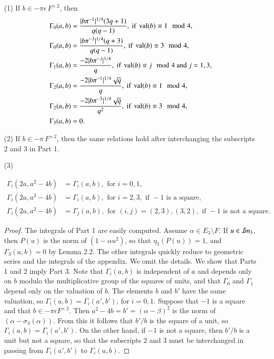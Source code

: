 \documentclass{amsart}
\newcommand\Imm{{\mathcal I\hskip-.2em m}}
\newcommand\val{\operatorname{val}}
\newenvironment{cthm}[1]
  {\renewcommand\thethm{\bf #1}\thm}
  {\endthm}
\begin{document}
\bigskip
\noindent
\begin{cthm}{Lemma 2.6}
(1)  If $b\in -\pi\epsilon\,F^{\times\,2}$, then
\begin{align*}
\Gamma_0(a,b) &= {|b\pi^{-1}|^{1/4}(3q+1)\over q(q-1)}, \text{ if }
			\val(b)\equiv 1 \mod 4,\\
\Gamma_0(a,b) &= {|b\pi^{-3}|^{1/4}(q+3)\over q(q-1)}, \text{ if }
			\val(b)\equiv 3 \mod 4,\\
\Gamma_1(a,b) &= {-2|b\pi^{-j}|^{1/4}\over q}, \text{ if }
			\val(b)\equiv j \mod 4 \text{ and } j=1, 3,\\
\Gamma_2(a,b) &= {-2|b\pi^{-1}|^{1/4}\sqrt{q}\over q}, \text{ if }
			\val(b)\equiv 1 \mod 4,\\
\Gamma_2(a,b) &= {-2|b\pi^{-3}|^{1/4}\sqrt{q}\over q^2}, \text{ if }
			\val(b)\equiv 3 \mod 4,\\
\Gamma_3(a,b) &= 0.
\end{align*}
\smallskip

(2)  If $b\in -\pi\,F^{\times\,2}$, then the same relations
hold after interchanging the subscripts $2$ and $3$ in Part 1.


\smallskip
(3)

\begin{align*}
\Gamma_i(2a,a^2-4b) &= \Gamma_i(a,b), \text{ for } i=0,1,\\
\Gamma_i(2a,a^2-4b) &= \Gamma_i(a,b), \text{ for } i=2,3, \text{ if }
		-1 \text{ is a square,}\\
\Gamma_i(2a,a^2-4b) &= \Gamma_j(a,b), \text{ for } (i,j) = (2,3), (3,2),
		\text{ if } -1 \text { is not a square.}
\end{align*}

\end{cthm}

\smallskip

\noindent
\begin{proof}
The integrals of Part 1 are easily computed. 
Assume 
$\alpha\in E_3\setminus F$.  
If $u\in \Imm_3$, then $P(u)$ is
the norm of $(1-\alpha u^2)$, so that $\eta_3(P(u)) = 1$,
and $\Gamma_3(a,b)=0$ by Lemma 2.2.
The other integrals quickly reduce to geometric series and the
integrals of the appendix.
 We omit the details.
We show that Parts 1 and 2 imply Part 3.
Note that
$\Gamma_i(a,b)$ is independent of $a$ and depends only on $b$ modulo
the multiplicative group of the squares of units, 
and that $\Gamma_0$ and $\Gamma_1$ depend only on the
valuation of $b$.  The elements $b$ and $b'$ have the same
valuation, so $\Gamma_i(a,b) = \Gamma_i(a',b')$, for
$i=0,1$.
Suppose that $-1$ is a square and that 
$b\in -\pi\epsilon F^{\times\, 2}$.
Then $a^2-4b = b' = (\alpha-\beta)^2$ is the norm of $(\alpha-\sigma_3(\alpha))$.
From this it follows that $b'/b$ is the square of a unit,
so $\Gamma_i(a,b) = \Gamma_i(a',b')$.
On the other hand, if
$-1$ is not a square, then 
$b'/b$ is a unit but not a square, so that the subscripts $2$ and $3$
must be interchanged in passing from $\Gamma_i(a',b')$ to
$\Gamma_i(a,b)$.  \end{proof}
\end{document}
